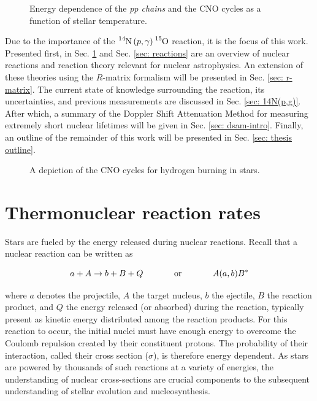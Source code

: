 \begin{figure}
\label{fig: CNO-energy}
\caption{Energy dependence of the \textit{pp chains} and the CNO cycles as a function of stellar temperature.}
\end{figure}



Due to the importance of the $\ce{^{14}N} \left( p, \gamma \right) \ce{^{15}O}$ reaction, it is the focus of this work. Presented first, in Sec. \ref{sec: thermonuclear reaction rates} and Sec. \ref{sec: reactions} are an overview of nuclear reactions and reaction theory relevant for nuclear astrophysics. An extension of these theories using the $R$-matrix formalism will be presented in Sec. \ref{sec: r-matrix}. The current state of knowledge surrounding the reaction, its uncertainties, and previous measurements are discussed in Sec. \ref{sec: 14N(p,g)}. After which, a summary of the Doppler Shift Attenuation Method for measuring extremely short nuclear lifetimes will be given in Sec. \ref{sec: dsam-intro}. Finally, an outline of the remainder of this work will be presented in Sec. \ref{sec: thesis outline}.


\begin{figure}
\label{fig: CNO-cycles}
\caption{A depiction of the CNO cycles for hydrogen burning in stars. }
\end{figure}




\section{Thermonuclear reaction rates}
\label{sec: thermonuclear reaction rates}

Stars are fueled by the energy released during nuclear reactions. Recall that a nuclear reaction can be written as 

\begin{equation}
a + A \rightarrow b + B + Q \hspace{0.5in} \text{or} \hspace{0.5in} A(a,b)B^{*}
\end{equation}

\noindent where $a$ denotes the projectile, $A$ the target nucleus, $b$ the ejectile, $B$ the reaction product, and $Q$ the energy released (or absorbed) during the reaction, typically present as kinetic energy distributed among the reaction products. For this reaction to occur, the initial nuclei must have enough energy to overcome the Coulomb repulsion created by their constituent protons. The probability of their interaction, called their cross section ($\sigma$), is therefore energy dependent. As stars are powered by thousands of such reactions at a variety of energies, the understanding of nuclear cross-sections are crucial components to the subsequent understanding of stellar evolution and nucleosynthesis. 

